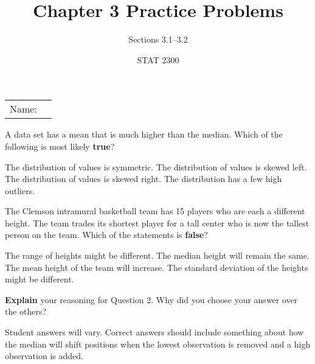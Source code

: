 \documentclass[noanswers]{exam}
\title{Chapter 3 Practice Problems}
\author{Sections 3.1--3.2}
\date{STAT 2300}
\begin{document}
\noindent\begin{tabular}{@{}p{.3in}p{3in}@{}}
Name: & \hrulefill
\end{tabular}

\vspace{1mm}

\begin{questions} 
	
	\question A data set has a mean that is much higher than the median. Which of the following is most likely \textbf{true}?
	
	\vspace{2mm}
	
	\begin{choices}
	
		\choice The distribution of values is symmetric.
		\choice The distribution of values is skewed left.
		\CorrectChoice The distribution of values is skewed right.
		\choice The distribution has a few high outliers.	
	
	\end{choices}
	
	\vspace{3mm}
	
	\question The Clemson intramural basketball team has 15 players who are each a different height. The team trades its shortest player for a tall center who is now the tallest person on the team. Which of the statements is \textbf{false}?
	
	\vspace{2mm}
	
	\begin{choices}
	
		\choice The range of heights might be different.
		\CorrectChoice The median height will remain the same.
		\choice The mean height of the team will increase.
		\choice The standard deviation of the heights might be different.	
	
	\end{choices}
	
	\vspace{3mm}
	
	\question \textbf{Explain} your reasoning for Question 2. Why did you choose your answer over the others?
	
	\begin{solution}[\stretch{1}]
	
		
			Student answers will vary. Correct answers should include something about how the median will shift positions when the lowest observation is removed and a high observation is added.


\end{solution}
\end{questions}
\end{document}
